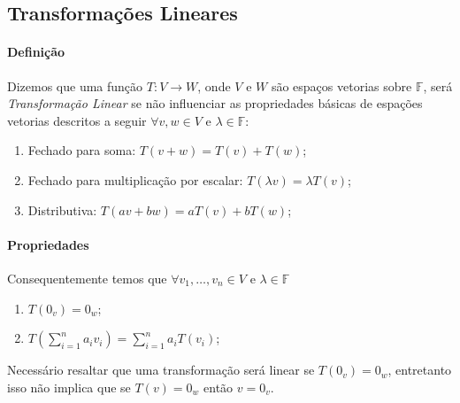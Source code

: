 \documentclass{article}
\begin{document}
        \subsection{Transformações Lineares}
            \paragraph{Definição}Dizemos que uma função $T: V\rightarrow W$, onde $V$ e $W$ são espaços vetorias sobre $\mathbb{F}$, será \textit{Transformação Linear} se não influenciar as propriedades básicas de espações vetorias descritos a seguir $\forall v, w\in V$ e $\lambda\in\mathbb{F}$:
                \begin{enumerate}[noitemsep]
                    \item Fechado para soma: $T(v+w) = T(v) + T(w)$;
                    \item Fechado para multiplicação por escalar: $T(\lambda v) = \lambda T(v)$;
                    \item Distributiva: $T(av+bw) = aT(v) + bT(w)$;
                \end{enumerate}

            \paragraph{Propriedades}Consequentemente temos que $\forall v_{1},\dots,v_{n}\in V$ e $\lambda\in\mathbb{F}$
                \begin{enumerate}[noitemsep]
                    \item $T(0_{v})=0_{w}$;
                    \item $T\left(\sum\limits_{i=1}^{n}a_{i}v_{i}\right) = \sum\limits_{i=1}^{n}a_{i}T(v_{i})$;
                \end{enumerate}
            Necessário resaltar que uma transformação será linear se $T(0_{v})=0_{w}$, entretanto isso não implica que se $T(v) = 0_{w}$ então $v =0_{v}$.
\end{document}
